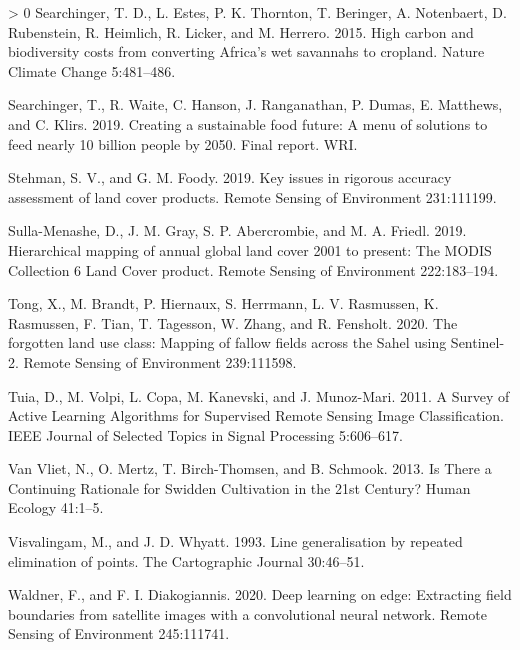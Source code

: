 \documentclass[11pt,a4paper]{article}
\newlength{\cslhangindent}
\newenvironment{CSLReferences}[3] %
 {%
  \setlength{\parindent}{0pt}
  \ifodd #1 \everypar{\setlength{\hangindent}{\cslhangindent}}\ignorespaces\fi
  \ifnum #2 > 0
  \setlength{\parskip}{#2\baselineskip}
  \fi
 }%
 {}
\begin{document}
\begin{CSLReferences}{1}{0}
\leavevmode\hypertarget{ref-SearchingerHighcarbonbiodiversity2015}{}%
Searchinger, T. D., L. Estes, P. K. Thornton, T. Beringer, A.
Notenbaert, D. Rubenstein, R. Heimlich, R. Licker, and M. Herrero. 2015.
High carbon and biodiversity costs from converting {Africa}'s wet
savannahs to cropland. Nature Climate Change 5:481--486.

\leavevmode\hypertarget{ref-searchingerCreatingSustainableFood2019}{}%
Searchinger, T., R. Waite, C. Hanson, J. Ranganathan, P. Dumas, E.
Matthews, and C. Klirs. 2019. Creating a sustainable food future: {A}
menu of solutions to feed nearly 10 billion people by 2050. {Final}
report. {WRI}.

\leavevmode\hypertarget{ref-StehmanKeyissuesrigorous2019}{}%
Stehman, S. V., and G. M. Foody. 2019. Key issues in rigorous accuracy
assessment of land cover products. Remote Sensing of Environment
231:111199.

\leavevmode\hypertarget{ref-sulla-menasheHierarchicalMappingAnnual2019}{}%
Sulla-Menashe, D., J. M. Gray, S. P. Abercrombie, and M. A. Friedl.
2019. Hierarchical mapping of annual global land cover 2001 to present:
{The MODIS Collection} 6 {Land Cover} product. Remote Sensing of
Environment 222:183--194.

\leavevmode\hypertarget{ref-Tongforgottenlanduse2020}{}%
Tong, X., M. Brandt, P. Hiernaux, S. Herrmann, L. V. Rasmussen, K.
Rasmussen, F. Tian, T. Tagesson, W. Zhang, and R. Fensholt. 2020. The
forgotten land use class: {Mapping} of fallow fields across the {Sahel}
using {Sentinel}-2. Remote Sensing of Environment 239:111598.

\leavevmode\hypertarget{ref-tuiaSurveyActiveLearning2011}{}%
Tuia, D., M. Volpi, L. Copa, M. Kanevski, and J. Munoz-Mari. 2011. A
{Survey} of {Active Learning Algorithms} for {Supervised Remote Sensing
Image Classification}. IEEE Journal of Selected Topics in Signal
Processing 5:606--617.

\leavevmode\hypertarget{ref-vanvlietThereContinuingRationale2013}{}%
Van Vliet, N., O. Mertz, T. Birch-Thomsen, and B. Schmook. 2013. Is
{There} a {Continuing Rationale} for {Swidden Cultivation} in the 21st
{Century}? Human Ecology 41:1--5.

\leavevmode\hypertarget{ref-visvalingamLineGeneralisationRepeated1993}{}%
Visvalingam, M., and J. D. Whyatt. 1993. Line generalisation by repeated
elimination of points. The Cartographic Journal 30:46--51.

\leavevmode\hypertarget{ref-waldnerDeepLearningEdge2020}{}%
Waldner, F., and F. I. Diakogiannis. 2020. Deep learning on edge:
{Extracting} field boundaries from satellite images with a convolutional
neural network. Remote Sensing of Environment 245:111741.


\end{CSLReferences}
\end{document}
